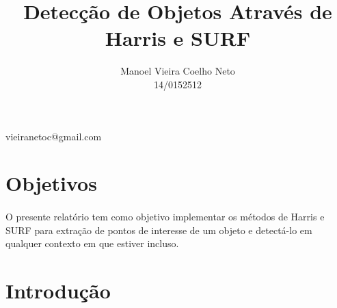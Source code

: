 \documentclass[conference,harvard,brazil,english]{sbatex}
\begin{document}
	\title{Detecção de Objetos Através de Harris e SURF}
	\author{Manoel Vieira Coelho Neto\\14/0152512}{vieiranetoc@gmail.com}
	\address{SQS 203 Bloco J\\ Brasília, DF, Brasil}
	
	\twocolumn[{
		\maketitle		
	}]
	\section{Objetivos}
	\paragraph{} O presente relatório tem como objetivo implementar os métodos de Harris e SURF para extração de pontos de interesse de um objeto e detectá-lo em qualquer contexto em que estiver incluso.
	
	\section{Introdução}
\end{document}
